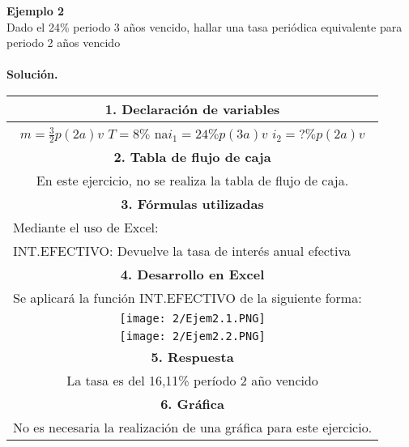 \textbf{Ejemplo 2}\\
Dado el 24\% periodo 3 años vencido, hallar una tasa periódica equivalente para periodo 2 años vencido\\ \\
\textbf{Solución.}\\
\begin{center}
 \renewcommand{\arraystretch}{1.5}%
 \begin{longtable}[H]{|p{0.5\linewidth}|p{0.5\linewidth}|}
  \hline
  \multicolumn{2}{|c|}{\cellcolor[HTML]{FFB183}\textbf{1. Declaración de variables}}                         \\ \hline
  \multicolumn{2}{|c|}{$m=\frac{3}{2}p(2a)v$  $T=8\% $ na$i_1=24\% p(3a)v$  $i_2=?\% p(2a)v$ }              \\ \hline                                         
  \multicolumn{2}{|c|}{\cellcolor[HTML]{FFB183}\textbf{2. Tabla de flujo de caja}}                           \\ \hline
  \multicolumn{2}{|c|}{En este ejercicio, no se realiza la tabla de flujo de caja.}                          \\ \hline
  \multicolumn{2}{|c|}{\cellcolor[HTML]{FFB183}\textbf{3. Fórmulas utilizadas}}                              \\ \hline
  \multicolumn{2}{|l|}{Mediante el uso de Excel:}                                                            \\
  \multicolumn{2}{|l|}{INT.EFECTIVO: Devuelve la tasa de interés anual efectiva}                             \\ \hline
  \multicolumn{2}{|c|}{\cellcolor[HTML]{FFB183}\textbf{4. Desarrollo en Excel}}                              \\ \hline
\multicolumn{2}{|l|}{Se aplicará la función INT.EFECTIVO de la siguiente forma:}                             \\
  \multicolumn{2}{|c|}{ \texttt{[image: 2/Ejem2.1.PNG]}}              \\
  \multicolumn{2}{|c|}{ \texttt{[image: 2/Ejem2.2.PNG]}}
 \\ \hline
  \multicolumn{2}{|c|}{\cellcolor[HTML]{FFB183}\textbf{5. Respuesta}}                                        \\ \hline
  \multicolumn{2}{|c|}{La tasa es del 16,11\% período 2 año vencido}                                        \\ \hline
  \multicolumn{2}{|c|}{\cellcolor[HTML]{FFB183}\textbf{6. Gráfica}}                                          \\ \hline
  \multicolumn{2}{|c|}{No es necesaria la realización de una gráfica para este ejercicio.}                   \\ \hline
 \end{longtable}
\end{center}
